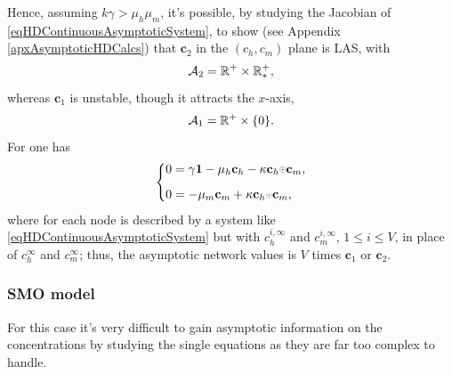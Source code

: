 \documentclass{article}
\begin{document}
                Hence, assuming $k\gamma>\mu_h\mu_m$, it's possible, by studying the Jacobian of \eqref{eqHDContinuousAsymptoticSystem}, to show (see Appendix \ref{apxAsymptoticHDCalcs}) that $\mathbf c_2$ in the $(c_h,c_m)$ plane is LAS, with
                \begin{equation*}
                    \mathcal A_2=\mathbb R^+\times\mathbb R_*^+,
                \end{equation*}
                whereas $\mathbf c_1$ is unstable, though it attracts the $x$-axis, \ie{}
                \begin{equation*}
                    \mathcal A_1=\mathbb R^+\times\{0\}.
                \end{equation*}
                For \HDdiscrete{} one has
                \begin{equation}
                    \left\{
                    \begin{aligned}
                        0&=\gamma\bOne
                        -\mu_h\mathbf c_h-\kappa\mathbf c_h\HadProd\mathbf c_m,\\[5pt]
                        0&=-\mu_m\mathbf c_m+\kappa\mathbf c_h\HadProd\mathbf c_m,
                    \end{aligned}
                    \right.
                    \label{eqHDDiscreteAsymptoticSystem}
                \end{equation}
                where for each node is described by a system like \eqref{eqHDContinuousAsymptoticSystem} but with $c^{i,\infty}_h$ and $c^{i,\infty}_m$, $1\le i\le V$, in place of $c^\infty_h$ and $c^\infty_m$; thus, the asymptotic network values is $V$ times $\mathbf c_1$ or $\mathbf c_2$.


            \subsubsection{SMO model}\label{secAsymptoticAnalysisSMO}

                For this case it's very difficult to gain asymptotic information on the concentrations by studying the single equations as they are far too complex to handle.
\end{document}
